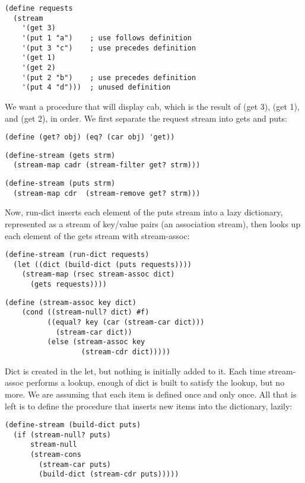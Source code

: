 \begin{verbatim}
(define requests
  (stream
    '(get 3)
    '(put 1 "a")    ; use follows definition
    '(put 3 "c")    ; use precedes definition
    '(get 1)
    '(get 2)
    '(put 2 "b")    ; use precedes definition
    '(put 4 "d")))  ; unused definition
\end{verbatim}

We want a procedure that will display cab, which is the result of (get
3), (get 1), and (get 2), in order. We first separate the request stream
into gets and puts:

\begin{verbatim}
(define (get? obj) (eq? (car obj) 'get))
\end{verbatim}

\begin{verbatim}
(define-stream (gets strm)
  (stream-map cadr (stream-filter get? strm)))
\end{verbatim}

\begin{verbatim}
(define-stream (puts strm)
  (stream-map cdr  (stream-remove get? strm)))
\end{verbatim}

Now, run-dict inserts each element of the puts stream into a lazy
dictionary, represented as a stream of key/value pairs (an association
stream), then looks up each element of the gets stream with
stream-assoc:

\begin{verbatim}
(define-stream (run-dict requests)
  (let ((dict (build-dict (puts requests))))
    (stream-map (rsec stream-assoc dict)
      (gets requests))))
\end{verbatim}

\begin{verbatim}
(define (stream-assoc key dict)
    (cond ((stream-null? dict) #f)
          ((equal? key (car (stream-car dict)))
            (stream-car dict))
          (else (stream-assoc key
                  (stream-cdr dict)))))
\end{verbatim}

Dict is created in the let, but nothing is initially added to it. Each
time stream-assoc performs a lookup, enough of dict is built to satisfy
the lookup, but no more. We are assuming that each item is defined once
and only once. All that is left is to define the procedure that inserts
new items into the dictionary, lazily:

\begin{verbatim}
(define-stream (build-dict puts)
  (if (stream-null? puts)
      stream-null
      (stream-cons
        (stream-car puts)
        (build-dict (stream-cdr puts)))))
\end{verbatim}

